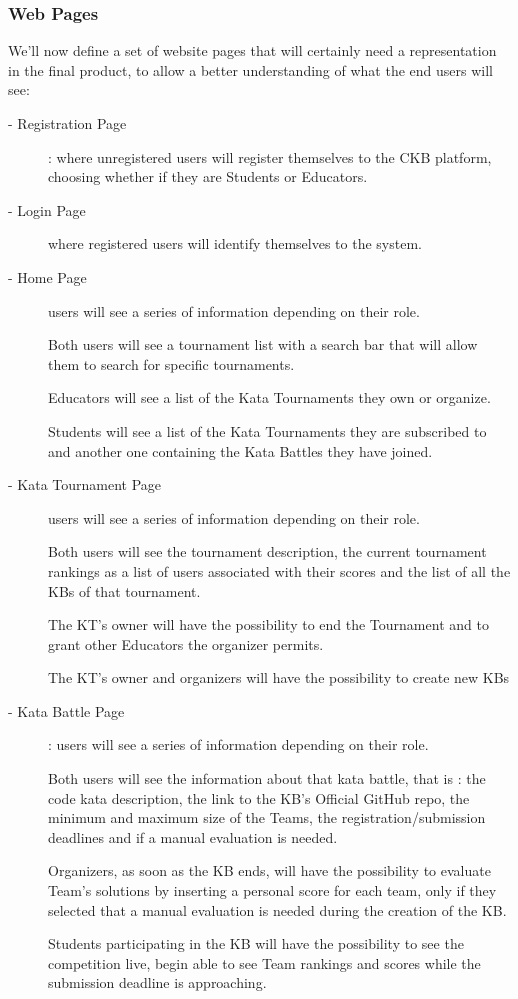 \documentclass[11pt]{report}
\begin{document}
\subsubsection{Web Pages}
We'll now define a set of website pages that will certainly need a representation in the final product, 
to allow a better understanding of what the end users will see:
\begin{description} 
    \item[- Registration Page] : where unregistered users will register themselves to the CKB platform, choosing
        whether if they are Students or Educators.
    \item[- Login Page]  where registered users will identify themselves to the system.
    \item[- Home Page]  users will see a series of information depending on their role.

        Both users will see a tournament list with a search bar that will allow them to search for specific tournaments.

        Educators will see a list of the Kata Tournaments they own or organize.

        Students will see a list of the Kata Tournaments they are subscribed to and another one containing the Kata Battles they have joined.
    \item[- Kata Tournament Page]  users will see a series of information depending on their role.

        Both users will see the tournament description, the current tournament rankings as a list of users associated with their scores
        and the list of all the KBs of that tournament.

        The KT's owner will have the possibility to end the Tournament and to grant other Educators the organizer permits.

        The KT's owner and organizers will have the possibility to create new KBs
    \item[- Kata Battle Page] : users will see a series of information depending on their role.

        Both users will see the information about that kata battle, that is : the code kata description, the link to the KB's Official GitHub repo, the minimum and maximum size of the Teams, the registration/submission deadlines and if a manual evaluation is needed.
        
        Organizers, as soon as the KB ends, will have the possibility to evaluate Team's solutions by inserting a personal score for each team, only if they selected that a manual evaluation is needed during the creation of the KB\@.

        Students participating in the KB will have the possibility to see the competition live, begin able to see Team rankings and scores while the submission deadline is approaching.
\end{description}
\end{document}
